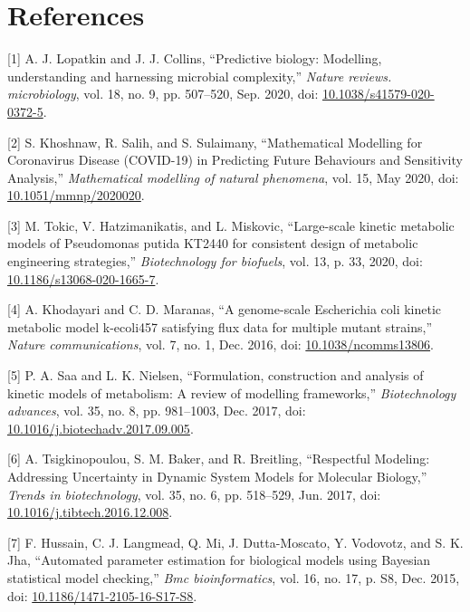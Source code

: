 \documentclass[11pt]{article}
\begin{document}
\section{References}
\label{sec:org59ecc75}

\hypertarget{citeproc_bib_item_1}{[1] A. J. Lopatkin and J. J. Collins, “Predictive biology: Modelling, understanding and harnessing microbial complexity,” \textit{Nature reviews. microbiology}, vol. 18, no. 9, pp. 507–520, Sep. 2020, doi: \href{https://doi.org/10.1038/s41579-020-0372-5}{10.1038/s41579-020-0372-5}.}

\hypertarget{citeproc_bib_item_2}{[2] S. Khoshnaw, R. Salih, and S. Sulaimany, “Mathematical Modelling for Coronavirus Disease (COVID-19) in Predicting Future Behaviours and Sensitivity Analysis,” \textit{Mathematical modelling of natural phenomena}, vol. 15, May 2020, doi: \href{https://doi.org/10.1051/mmnp/2020020}{10.1051/mmnp/2020020}.}

\hypertarget{citeproc_bib_item_3}{[3] M. Tokic, V. Hatzimanikatis, and L. Miskovic, “Large-scale kinetic metabolic models of Pseudomonas putida KT2440 for consistent design of metabolic engineering strategies,” \textit{Biotechnology for biofuels}, vol. 13, p. 33, 2020, doi: \href{https://doi.org/10.1186/s13068-020-1665-7}{10.1186/s13068-020-1665-7}.}

\hypertarget{citeproc_bib_item_4}{[4] A. Khodayari and C. D. Maranas, “A genome-scale Escherichia coli kinetic metabolic model k-ecoli457 satisfying flux data for multiple mutant strains,” \textit{Nature communications}, vol. 7, no. 1, Dec. 2016, doi: \href{https://doi.org/10.1038/ncomms13806}{10.1038/ncomms13806}.}

\hypertarget{citeproc_bib_item_5}{[5] P. A. Saa and L. K. Nielsen, “Formulation, construction and analysis of kinetic models of metabolism: A review of modelling frameworks,” \textit{Biotechnology advances}, vol. 35, no. 8, pp. 981–1003, Dec. 2017, doi: \href{https://doi.org/10.1016/j.biotechadv.2017.09.005}{10.1016/j.biotechadv.2017.09.005}.}

\hypertarget{citeproc_bib_item_6}{[6] A. Tsigkinopoulou, S. M. Baker, and R. Breitling, “Respectful Modeling: Addressing Uncertainty in Dynamic System Models for Molecular Biology,” \textit{Trends in biotechnology}, vol. 35, no. 6, pp. 518–529, Jun. 2017, doi: \href{https://doi.org/10.1016/j.tibtech.2016.12.008}{10.1016/j.tibtech.2016.12.008}.}

\hypertarget{citeproc_bib_item_7}{[7] F. Hussain, C. J. Langmead, Q. Mi, J. Dutta-Moscato, Y. Vodovotz, and S. K. Jha, “Automated parameter estimation for biological models using Bayesian statistical model checking,” \textit{Bmc bioinformatics}, vol. 16, no. 17, p. S8, Dec. 2015, doi: \href{https://doi.org/10.1186/1471-2105-16-S17-S8}{10.1186/1471-2105-16-S17-S8}.}
\end{document}
